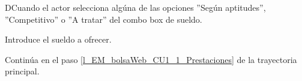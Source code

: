 	\begin{UCtrayectoriaA}{D}{Cuando el actor selecciona algúna de las opciones ''Según aptitudes'', ''Competitivo'' o ''A tratar'' del combo box de sueldo.}

		\UCpaso [\UCactor] Introduce el sueldo a ofrecer.

		\UCpaso Continúa en el paso \ref{l_EM_bolsaWeb_CU1_1_Prestaciones} de la trayectoria principal.

	\end{UCtrayectoriaA}
